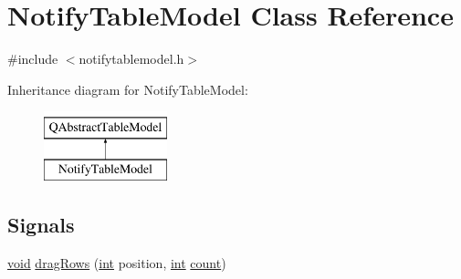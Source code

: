 \hypertarget{class_notify_table_model}{\section{Notify\-Table\-Model Class Reference}
\label{class_notify_table_model}
}


{\ttfamily \#include $<$notifytablemodel.\-h$>$}

Inheritance diagram for Notify\-Table\-Model\-:\begin{figure}[H]
\begin{center}
\leavevmode
\includegraphics[height=2.000000cm]{class_notify_table_model}
\end{center}
\end{figure}
\subsection*{Signals}
\begin{DoxyCompactItemize}
\item 
\hyperlink{group___u_a_v_objects_plugin_ga444cf2ff3f0ecbe028adce838d373f5c}{void} \hyperlink{group__notifyplugin_ga87b02089128dd9f2eddbd2e70040201f}{drag\-Rows} (\hyperlink{ioapi_8h_a787fa3cf048117ba7123753c1e74fcd6}{int} position, \hyperlink{ioapi_8h_a787fa3cf048117ba7123753c1e74fcd6}{int} \hyperlink{glext_8h_a5b40aca7a9682963dd00a8f5aef0a901}{count})
\end{DoxyCompactItemize}
